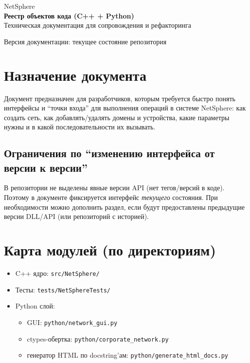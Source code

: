 \documentclass[14pt,a4paper]{extarticle}
\begin{document}
\begin{titlepage}
    \begin{center}
        \large
        NetSphere\\[10pt]
        \textbf{Реестр объектов кода (C++ + Python)}\\[12pt]
        {\normalsize Техническая документация для сопровождения и рефакторинга}
    \end{center}
    \vfill
    \begin{flushright}
        \normalsize
        Версия документации: текущее состояние репозитория
    \end{flushright}
\end{titlepage}

\tableofcontents
\newpage

\section{Назначение документа}
Документ предназначен для разработчиков, которым требуется быстро понять интерфейсы и ``точки входа'' для выполнения операций в системе NetSphere:
как создать сеть, как добавлять/удалять домены и устройства, какие параметры нужны и в какой последовательности их вызывать.

\subsection{Ограничения по ``изменению интерфейса от версии к версии''}
В репозитории не выделены явные версии API (нет тегов/версий в коде). Поэтому в документе фиксируется интерфейс \emph{текущего} состояния.
При необходимости можно дополнить раздел, если будут предоставлены предыдущие версии DLL/API (или репозиторий с историей).

\section{Карта модулей (по директориям)}
\begin{itemize}[leftmargin=*]
  \item C++ ядро: \texttt{src/NetSphere/}
  \item Тесты: \texttt{tests/NetSphereTests/}
  \item Python слой:
  \begin{itemize}
    \item GUI: \texttt{python/network\_gui.py}
    \item ctypes-обертка: \texttt{python/corporate\_network.py}
    \item генератор HTML по docstring'ам: \texttt{python/generate\_html\_docs.py}
  \end{itemize}
\end{itemize}
\end{document}
